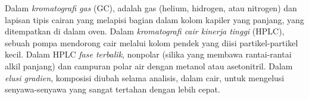 \begin{definition}\label{def:b2:chromatography:techniques}
Dalam \emph{kromatografi gas} (GC), 
adalah gas (helium, hidrogen, atau nitrogen) dan  lapisan tipis
cairan yang melapisi bagian dalam kolom kapiler yang panjang, yang
ditempatkan di dalam oven. Dalam \emph{kromatografi cair kinerja
tinggi}
(HPLC), sebuah pompa mendorong  cair melalui kolom pendek yang
diisi partikel-partikel kecil. Dalam HPLC \emph{fase terbalik},
 nonpolar
(silika yang membawa rantai-rantai alkil panjang) dan  campuran
polar air dengan metanol atau asetonitril. Dalam \emph{elusi
gradien}, komposisi  diubah selama analisis,
dalam  cair, untuk mengelusi senyawa-senyawa yang sangat
tertahan dengan lebih cepat.
\end{definition}

